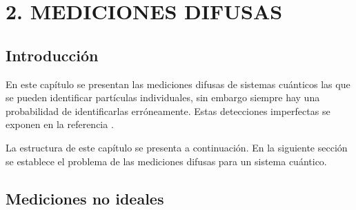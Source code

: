 \chapter[MEDICIONES DIFUSAS ]{2. MEDICIONES DIFUSAS}

\section{Introducción}
 En este capítulo se presentan las mediciones difusas de sistemas cuánticos las que se pueden identificar partículas individuales, sin embargo siempre hay una probabilidad de identificarlas erróneamente. Estas detecciones imperfectas se exponen en la referencia {\cite{Pineda_2021}}. %

La estructura de este capítulo se presenta a continuación. 
En la siguiente sección se establece el problema de las mediciones difusas para un sistema cuántico. 


\section{Mediciones no ideales}





